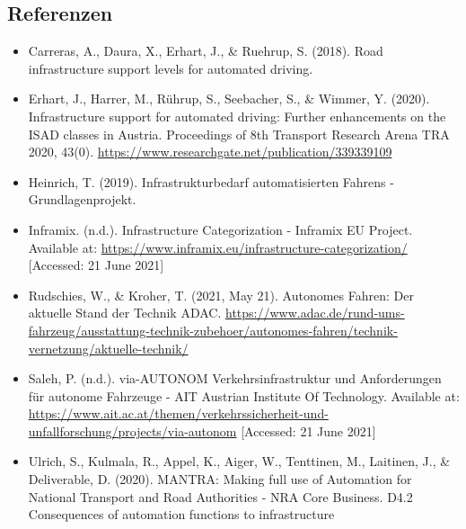 \documentclass[
]{book}
\providecommand{\tightlist}{%
  \setlength{\itemsep}{0pt}\setlength{\parskip}{0pt}}
\begin{document}
\hypertarget{referenzen-19}{%
\subsection*{Referenzen}\label{referenzen-19}}

\begin{itemize}
\tightlist
\item
  Carreras, A., Daura, X., Erhart, J., \& Ruehrup, S. (2018). Road infrastructure support levels for automated driving.
\item
  Erhart, J., Harrer, M., Rührup, S., Seebacher, S., \& Wimmer, Y. (2020). Infrastructure support for automated driving: Further enhancements on the ISAD classes in Austria. Proceedings of 8th Transport Research Arena TRA 2020, 43(0). \url{https://www.researchgate.net/publication/339339109}
\item
  Heinrich, T. (2019). Infrastrukturbedarf automatisierten Fahrens - Grundlagenprojekt.
\item
  Inframix. (n.d.). Infrastructure Categorization - Inframix EU Project. Available at: \url{https://www.inframix.eu/infrastructure-categorization/} {[}Accessed: 21 June 2021{]}
\item
  Rudschies, W., \& Kroher, T. (2021, May 21). Autonomes Fahren: Der aktuelle Stand der Technik \textbar{} ADAC. \url{https://www.adac.de/rund-ums-fahrzeug/ausstattung-technik-zubehoer/autonomes-fahren/technik-vernetzung/aktuelle-technik/}
\item
  Saleh, P. (n.d.). via-AUTONOM Verkehrsinfrastruktur und Anforderungen für autonome Fahrzeuge - AIT Austrian Institute Of Technology. Available at: \url{https://www.ait.ac.at/themen/verkehrssicherheit-und-unfallforschung/projects/via-autonom} {[}Accessed: 21 June 2021{]}
\item
  Ulrich, S., Kulmala, R., Appel, K., Aiger, W., Tenttinen, M., Laitinen, J., \& Deliverable, D. (2020). MANTRA: Making full use of Automation for National Transport and Road Authorities - NRA Core Business. D4.2 Consequences of automation functions to infrastructure
\end{itemize}

  
\end{document}
